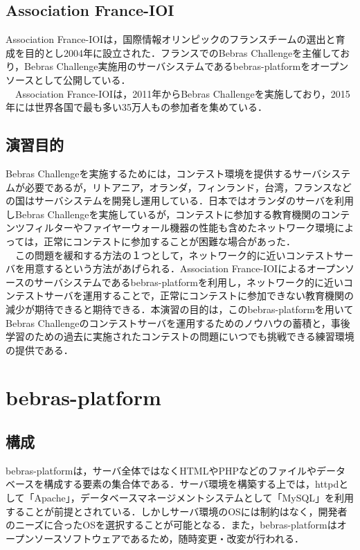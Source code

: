 \documentclass[a4paper]{jarticle}
\begin{document}
\begin{multicols}{2}
\subsection{Association France-IOI}
Association France-IOIは，国際情報オリンピックのフランスチームの選出と育成を目的とし2004年に設立された．フランスでのBebras Challengeを主催しており，Bebras Challenge実施用のサーバシステムであるbebras-platformをオープンソースとして公開している．
\\　Association France-IOIは，2011年からBebras Challengeを実施しており，2015年には世界各国で最も多い35万人もの参加者を集めている．
\subsection{演習目的}
Bebras Challengeを実施するためには，コンテスト環境を提供するサーバシステムが必要であるが，リトアニア，オランダ，フィンランド，台湾，フランスなどの国はサーバシステムを開発し運用している．日本ではオランダのサーバを利用しBebras Challengeを実施しているが，コンテストに参加する教育機関のコンテンツフィルターやファイヤーウォール機器の性能も含めたネットワーク環境によっては，正常にコンテストに参加することが困難な場合があった．
\\　この問題を緩和する方法の１つとして，ネットワーク的に近いコンテストサーバを用意するという方法があげられる．Association France-IOIによるオープンソースのサーバシステムであるbebras-platformを利用し，ネットワーク的に近いコンテストサーバを運用することで，正常にコンテストに参加できない教育機関の減少が期待できると期待できる．本演習の目的は，このbebras-platformを用いてBebras Challengeのコンテストサーバを運用するためのノウハウの蓄積と，事後学習のための過去に実施されたコンテストの問題にいつでも挑戦できる練習環境の提供である．

\section{bebras-platform}


\subsection{構成}
bebras-platformは，サーバ全体ではなくHTMLやPHPなどのファイルやデータベースを構成する要素の集合体である．サーバ環境を構築する上では，httpdとして「Apache」，データベースマネージメントシステムとして「MySQL」を利用することが前提とされている．しかしサーバ環境のOSには制約はなく，開発者のニーズに合ったOSを選択することが可能となる．また，bebras-platformはオープンソースソフトウェアであるため，随時変更・改変が行われる．


\end{multicols}
\end{document}
